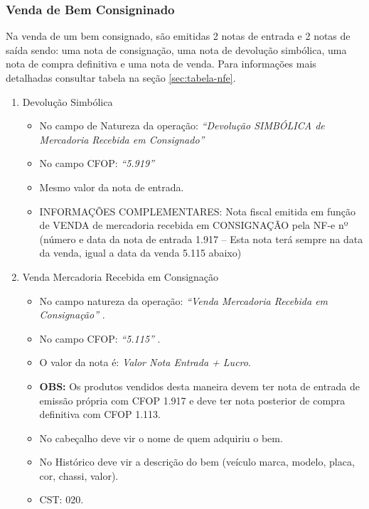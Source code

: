\documentclass{article}
\newcommand{\itasp}[1]{
  \textit{``#1''}
}
\begin{document}
\subsubsection{Venda de Bem Consigninado}
\label{emissaonfe:saida-venda-consig}
Na venda de um bem consignado, são emitidas 2 notas de entrada e 2 notas de saída sendo: uma nota de consignação, uma nota de devolução simbólica, uma nota de compra definitiva e uma nota de venda. Para informações mais detalhadas consultar tabela na seção \ref{sec:tabela-nfe}.
\begin{enumerate}
  \item Devolução Simbólica
  \begin{itemize}
    \item No campo de Natureza da operação: \itasp{Devolução SIMBÓLICA de Mercadoria Recebida em Consignado}
    \item No campo CFOP: \itasp{5.919}
    \item Mesmo valor da nota de entrada.
    \item INFORMAÇÕES COMPLEMENTARES: Nota fiscal emitida em função de VENDA de mercadoria recebida em CONSIGNAÇÃO pela NF-e nº (número e data da nota de entrada 1.917 – Esta nota terá sempre na data da venda, igual a data da venda 5.115 abaixo)
  \end{itemize}
  \item Venda Mercadoria Recebida em Consignação
  \begin{itemize}
    \item No campo natureza da operação: \itasp{Venda Mercadoria Recebida em Consignação}.
    \item No campo CFOP: \itasp{5.115}.
    \item O valor da nota é: \textit{Valor Nota Entrada + Lucro}.
    \item \textbf{OBS:} Os produtos vendidos desta maneira devem ter nota de entrada de emissão própria com CFOP 1.917 e deve ter nota posterior de compra definitiva com CFOP 1.113.
    \item No cabeçalho deve vir o nome de quem adquiriu o bem.
    \item No Histórico deve vir a descrição do bem (veículo marca, modelo, placa, cor, chassi, valor).
    \item CST: 020.
  \end{itemize}
\end{enumerate}
\end{document}
